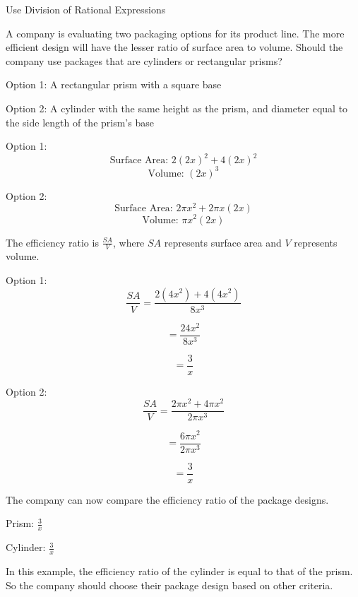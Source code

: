 \documentclass{article}
\newenvironment{example}[1]{}{}         %
\newcommand{\answer}[1]{}               %
\newcommand{\placeholder}[2]{}          %
\begin{document}
\begin{example}{6}
Use Division of Rational Expressions

A company is evaluating two packaging options for its product line. The more efficient design will have the lesser ratio of surface area to volume. Should the company use packages that are cylinders or rectangular prisms?

\placeholder{illustration}{Two package options: Option 1 is a rectangular prism with a square base; Option 2 is a cylinder with the same height as the prism and diameter equal to the side length of the prism's base.}


Option 1: A rectangular prism with a square base

Option 2: A cylinder with the same height as the prism, and diameter equal to the side length of the prism's base

Option 1:
\[
\text{Surface Area: }2(2x)^2+4(2x)^2
\]
\[
\text{Volume: }(2x)^3
\]

Option 2:
\[
\text{Surface Area: }2\pi x^2+2\pi x(2x)
\]
\[
\text{Volume: }\pi x^2(2x)
\]

The efficiency ratio is \(\frac{SA}{V}\), where \(SA\) represents surface area and \(V\) represents volume.

Option 1:
\[
\frac{SA}{V}
=
\frac{2(4x^2)+4(4x^2)}{8x^3}
\]

\[
=
\frac{24x^2}{8x^3}
\]

\[
=
\frac{3}{x}
\]

Option 2:
\[
\frac{SA}{V}
=
\frac{2\pi x^2+4\pi x^2}{2\pi x^3}
\]

\[
=
\frac{6\pi x^2}{2\pi x^3}
\]

\[
=
\frac{3}{x}
\]

The company can now compare the efficiency ratio of the package designs.

Prism: \(\frac{3}{x}\)

Cylinder: \(\frac{3}{x}\)

In this example, the efficiency ratio of the cylinder is equal to that of the prism. So the company should choose their package design based on other criteria.

\answer{The efficiency ratio of the cylinder is equal to that of the prism.}
\end{example}
\end{document}
